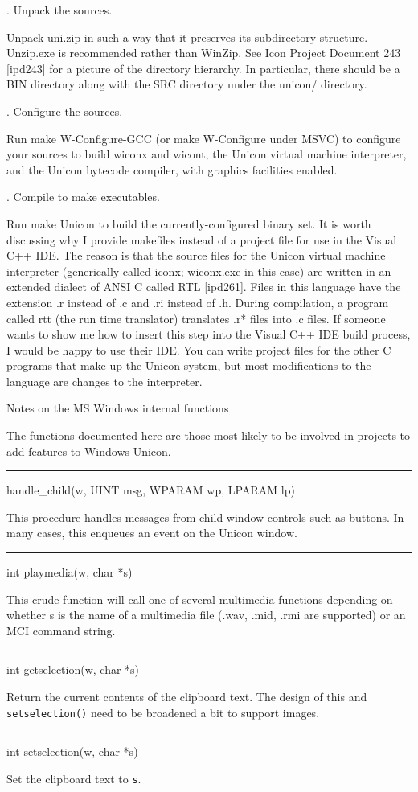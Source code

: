 {. Unpack the sources.}

Unpack uni.zip in such a way that it preserves its subdirectory
structure. Unzip.exe is recommended rather than WinZip.  See Icon
Project Document 243 [ipd243] for a picture of the directory
hierarchy. In particular, there should be a BIN directory along with
the SRC directory under the unicon/ directory.

{. Configure the sources.}


Run {\textquotedbl}make W-Configure-GCC{\textquotedbl} (or
{\textquotedbl}make W-Configure{\textquotedbl} under MSVC) to
configure your sources to build wiconx and wicont, the Unicon virtual
machine interpreter, and the Unicon bytecode compiler, with graphics
facilities enabled.

{. Compile to make executables.}


Run {\textquotedbl}make Unicon{\textquotedbl} to build the
currently-configured binary set. It is worth discussing why I provide
makefiles instead of a project file for use in the Visual C++ IDE.
The reason is that the source files for the Unicon virtual machine
interpreter (generically called iconx; wiconx.exe in this case) are
written in an extended dialect of ANSI C called RTL [ipd261]. Files in
this language have the extension .r instead of .c and .ri instead of
.h. During compilation, a program called rtt (the run time translator)
translates .r* files into .c files. If someone wants to show me how to
insert this step into the Visual C++ IDE build process, I would be
happy to use their IDE. You can write project files for the other C
programs that make up the Unicon system, but most modifications to the
language are changes to the interpreter.

{\sffamily
Notes on the MS Windows internal functions}


The functions documented here are those most likely to be involved in
projects to add features to Windows Unicon.

{\sffamily\bfseries
\bigskip\hrule\vspace{0.1cm}
\noindent
handle\_child(w, UINT msg, WPARAM wp, LPARAM lp)}


This procedure handles messages from child window controls such as
buttons. In many cases, this enqueues an event on the Unicon window.


\bigskip\hrule\vspace{0.1cm}
\noindent
int playmedia(w, char *s)


This crude function will call one of several multimedia functions
depending on whether s is the name of a multimedia file (.wav, .mid,
.rmi are supported) or an MCI command string.


\bigskip\hrule\vspace{0.1cm}
\noindent
int getselection(w, char *s)


Return the current contents of the clipboard text. The design of this
and \texttt{setselection()} need to be broadened a bit to support
images.


\bigskip\hrule\vspace{0.1cm}
\noindent
int setselection(w, char *s)


Set the clipboard text to \texttt{s}.

